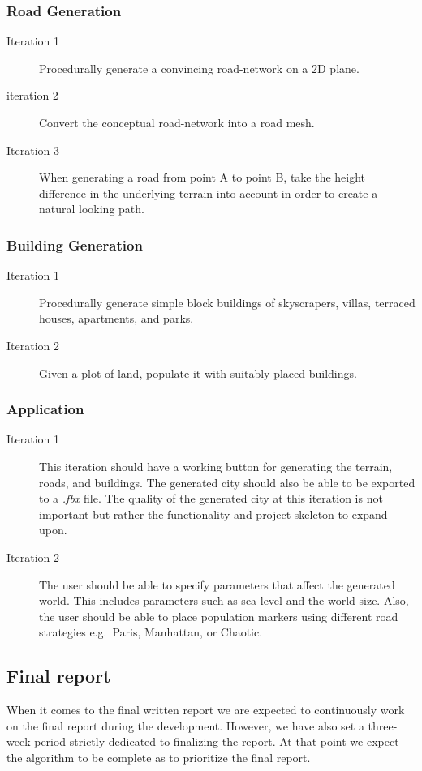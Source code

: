 \subsubsection{Road Generation}
\begin{description}
  \item[Iteration 1] Procedurally generate a convincing road-network on a 2D plane.
  \item[iteration 2] Convert the conceptual road-network into a road mesh.
  \item[Iteration 3] When generating a road from point A to point B, take the height difference in the underlying terrain into account in order to create a natural looking path.
\end{description}

\subsubsection{Building Generation}
\begin{description}
  \item[Iteration 1] Procedurally generate simple block buildings of skyscrapers, villas, terraced houses, apartments, and parks.
  \item[Iteration 2] Given a plot of land, populate it with suitably placed buildings.
\end{description}

\subsubsection{Application}
\begin{description}
  \item[Iteration 1]
    This iteration should have a working button for generating the terrain, roads, and buildings.
    The generated city should also be able to be exported to a \textit{.fbx} file.
    The quality of the generated city at this iteration is not important but rather the functionality and project skeleton to expand upon.
  \item[Iteration 2]
    The user should be able to specify parameters that affect the generated world.
    This includes parameters such as sea level and the world size.
    Also, the user should be able to place population markers using different road strategies e.g.\ Paris, Manhattan, or Chaotic.
\end{description}

\subsection{Final report}
When it comes to the final written report we are expected to continuously work on the final report during the development.
However, we have also set a three-week period strictly dedicated to finalizing the report.
At that point we expect the algorithm to be complete as to prioritize the final report.

